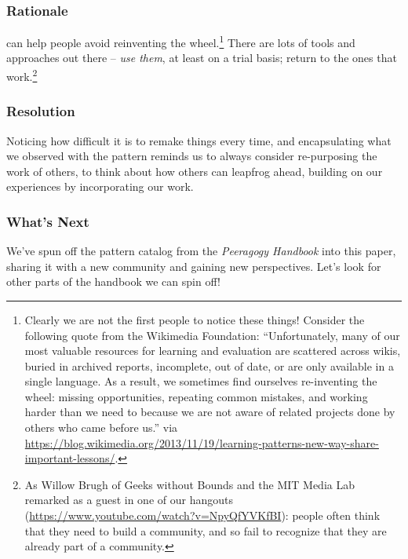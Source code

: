 \subsubsection*{Rationale} 
 can help people avoid reinventing the wheel.\footnote{Clearly we are not the first people to notice these things!  Consider the following quote from the Wikimedia Foundation: ``Unfortunately, many of our most valuable resources for learning and evaluation are scattered across wikis, buried in archived reports, incomplete, out of date, or are only available in a single language. As a result, we sometimes find ourselves re-inventing the wheel: missing opportunities, repeating common mistakes, and working harder than we need to because we are not aware of related projects done by others who came before us.'' via \url{https://blog.wikimedia.org/2013/11/19/learning-patterns-new-way-share-important-lessons/}.}  There are lots of tools and approaches out there -- \emph{use them}, at least on a trial basis; return to the ones that work.\footnote{As Willow Brugh of Geeks without Bounds and the MIT Media Lab remarked as a guest in one of our hangouts (\url{https://www.youtube.com/watch?v=NpyQfYVKfBI}): people often think that they need to build a community, and so fail to recognize that they are already part of a community.}

\subsubsection*{Resolution} Noticing how difficult it is to remake things every time, and encapsulating what we observed with the  pattern reminds us to always consider re-purposing the work of others, to think about how others can leapfrog ahead, building on our experiences by incorporating our work.

\subsubsection*{What's Next} We've spun off the pattern catalog from the \emph{Peeragogy Handbook} into this paper, sharing it with a new community and gaining new perspectives.  Let's look for other parts of the handbook we can spin off!

\endgroup